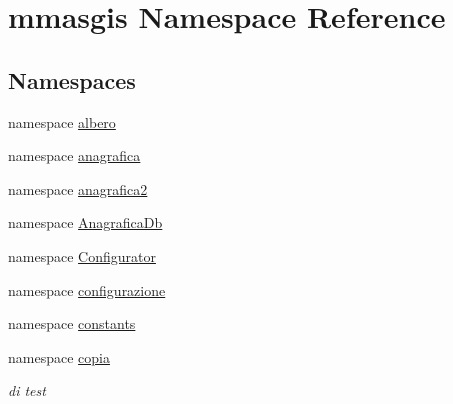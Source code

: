 \hypertarget{namespacemmasgis}{
\section{mmasgis Namespace Reference}
\label{namespacemmasgis}
}
\subsection*{Namespaces}
\begin{DoxyCompactItemize}
\item 
namespace \hyperlink{namespacemmasgis_1_1albero}{albero}
\item 
namespace \hyperlink{namespacemmasgis_1_1anagrafica}{anagrafica}
\item 
namespace \hyperlink{namespacemmasgis_1_1anagrafica2}{anagrafica2}
\item 
namespace \hyperlink{namespacemmasgis_1_1AnagraficaDb}{AnagraficaDb}
\item 
namespace \hyperlink{namespacemmasgis_1_1Configurator}{Configurator}
\item 
namespace \hyperlink{namespacemmasgis_1_1configurazione}{configurazione}
\item 
namespace \hyperlink{namespacemmasgis_1_1constants}{constants}
\item 
namespace \hyperlink{namespacemmasgis_1_1copia}{copia}


\begin{DoxyCompactList}\small\item\em di test \item\end{DoxyCompactList}


\end{DoxyCompactItemize}
